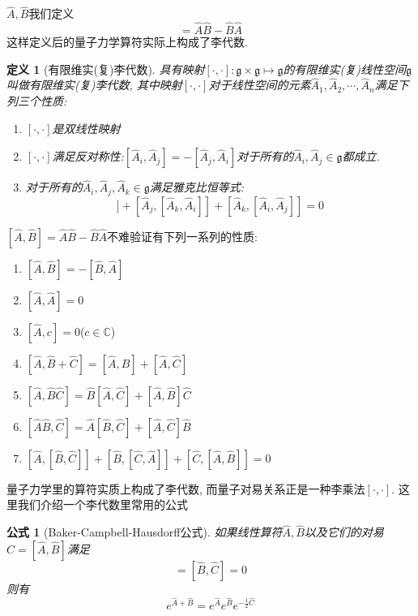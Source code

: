 \documentclass[a4paper,11pt]{book}
\newtheorem{definition}{\hspace{2em}定义}[section]
\newtheorem{formula}{公式}[section]
\newcommand{\A}{\hat{A}}
\newcommand{\B}{\hat{B}}
\newcommand{\hC}{\hat{C}}
\begin{document}
$\A,\B$我们定义
\begin{equation*}
  [\A,\B]=\A\B-\B\A
\end{equation*}
这样定义后的量子力学算符实际上构成了李代数.
\begin{definition}[有限维实(复)李代数]
具有映射$[\cdot,\cdot]:\mathfrak{g}\times\mathfrak{g}\mapsto\mathfrak{g}$的有限维实(复)线性空间$\mathfrak{g}$叫做有限维实(复)李代数, 其中映射$[\cdot,\cdot]$对于线性空间的元素$\A_1,\A_2,\cdots,\A_n$满足下列三个性质:
\begin{enumerate}
  \item $[\cdot,\cdot]$是双线性映射
  \item $[\cdot,\cdot]$满足反对称性:$[\A_i,\A_j]=-[\A_j,\A_i]$对于所有的$\A_i,\A_j\in\mathfrak{g}$都成立.
  \item 对于所有的$\A_i,\A_j,\A_k\in\mathfrak{g}$满足雅克比恒等式:
  \begin{equation*}
    [\A_i,[\A_j,\A_k]]+[\A_j,[\A_k,\A_i]]+[\A_k,[\A_i,\A_j]]=0
  \end{equation*}
\end{enumerate}
\end{definition}
$[\A,\B]=\A\B-\B\A$不难验证有下列一系列的性质:
\begin{enumerate}
  \item $[\A,\B]=-[\B,\A]$
  \item $[\A,\A]=0$
  \item $[\A,c]=0$\quad($c\in\mathbb{C}$)
  \item $[\A,\B+\hC]=[\A,\B]+[\A,\hC]$
  \item $[\A,\B\hC]=\B[\A,\hC]+[\A,\B]\hC$
  \item $[\A\B,\hC]=\A[\B,\hC]+[\A,\hC]\B$
  \item $[\A,[\B,\hC]]+[\B,[\hC,\A]]+[\hC,[\A,\B]]=0$
\end{enumerate}
量子力学里的算符实质上构成了李代数, 而量子对易关系正是一种李乘法$[\cdot,\cdot]$. 这里我们介绍一个李代数里常用的公式
\begin{formula}[Baker-Campbell-Hausdorff公式]\label{BHC formula}
  如果线性算符$\A,\B$以及它们的对易$\hC=[\A,\B]$满足
  \begin{equation*}
    [\A,\hC]=[\B,\hC]=0
  \end{equation*}
  则有
  \begin{equation*}
    e^{\A+\B}=e^{\A}e^{\B}e^{-\frac{1}{2}\hC}
  \end{equation*}
\end{formula}
\end{document}
